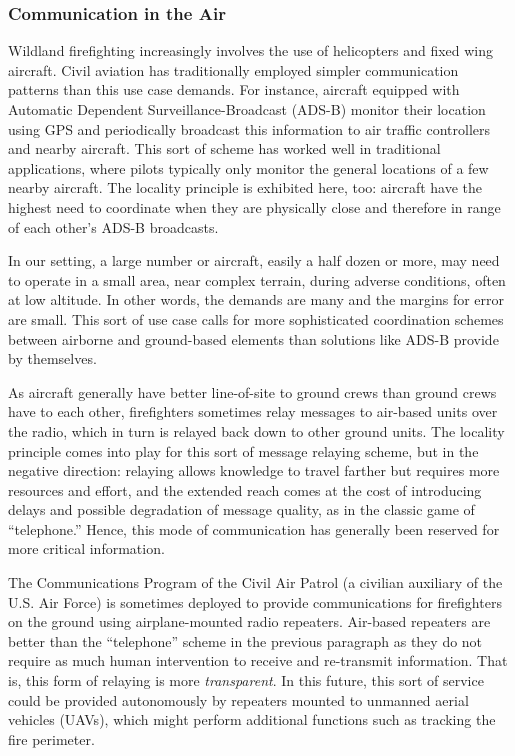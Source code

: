 \documentclass[]             %
{NASA}                       %
\theoremstyle{definition}
\begin{document}
\subsubsection{Communication in the Air}
Wildland firefighting increasingly involves the use of helicopters and
fixed wing aircraft. Civil aviation has traditionally employed simpler
communication patterns than this use case demands. For instance,
aircraft equipped with Automatic Dependent Surveillance-Broadcast
(ADS-B) monitor their location using GPS and periodically broadcast
this information to air traffic controllers and nearby aircraft. This
sort of scheme has worked well in traditional applications, where
pilots typically only monitor the general locations of a few nearby
aircraft. The locality principle is exhibited here, too: aircraft have
the highest need to coordinate when they are physically close and
therefore in range of each other's ADS-B broadcasts.

In our setting, a large number or aircraft, easily a half dozen or
more, may need to operate in a small area, near complex terrain,
during adverse conditions, often at low altitude. In other words, the
demands are many and the margins for error are small. This sort of use
case calls for more sophisticated coordination schemes between
airborne and ground-based elements than solutions like ADS-B provide
by themselves.

As aircraft generally have better line-of-site to ground crews than
ground crews have to each other, firefighters sometimes relay messages
to air-based units over the radio, which in turn is relayed back down
to other ground units. The locality principle comes into play for this
sort of message relaying scheme, but in the negative direction:
relaying allows knowledge to travel farther but requires more resources and effort,
and the extended reach comes at the cost of introducing delays and
possible degradation of message quality, as in the classic game of
``telephone.'' Hence, this mode of communication has generally been reserved for
more critical information.

The Communications Program of the Civil Air Patrol (a civilian
auxiliary of the U.S. Air Force) is sometimes deployed to provide
communications for firefighters on the ground using airplane-mounted
radio repeaters. Air-based repeaters are better than the ``telephone''
scheme in the previous paragraph as they do not require as much human
intervention to receive and re-transmit information. That is, this
form of relaying is more \emph{transparent}. In this future, this sort
of service could be provided autonomously by repeaters mounted to
unmanned aerial vehicles (UAVs), which might perform additional
functions such as tracking the fire perimeter.
\end{document}
